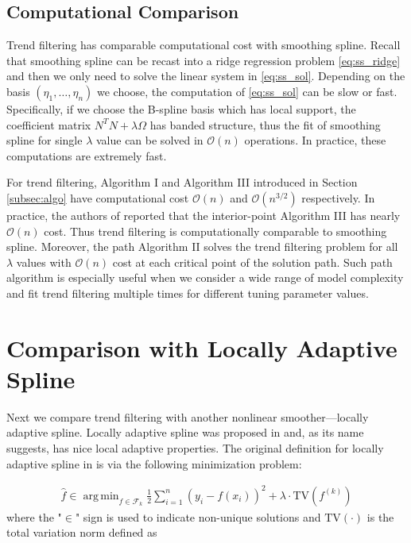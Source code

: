 \documentclass[a4paper]{article}
\DeclareMathOperator*{\argmin}{arg\,min}
\renewcommand{\cal}{\mathcal}
\begin{document}
\subsection{Computational Comparison}
\label{subsec:sscomp}
Trend filtering has comparable computational cost with smoothing spline. Recall that smoothing spline can be recast into a ridge regression problem \eqref{eq:ss_ridge} and then we only need to solve the linear system in \eqref{eq:ss_sol}. Depending on the basis $(\eta_1,\ldots, \eta_n)$ we choose, the computation of \eqref{eq:ss_sol} can be slow or fast. Specifically, if we choose the B-spline basis which has local support, the coefficient matrix $N^TN+\lambda\Omega$ has banded structure, thus the fit of smoothing spline for single $\lambda$ value can be solved in $\cal{O}(n)$ operations. In practice, these computations are extremely fast. 

For trend filtering, Algorithm I and Algorithm III introduced in Section \ref{subsec:algo} have computational cost $\cal{O}(n)$ and $\cal{O}(n^{3/2})$ respectively. In practice, the authors of \cite{kim2009ell_1} reported that the interior-point Algorithm III has nearly $\cal{O}(n)$ cost. Thus trend filtering is computationally comparable to smoothing spline. Moreover, the path Algorithm II solves the trend filtering problem for all $\lambda$ values with $\cal{O}(n)$ cost at each critical point of the solution path. Such path algorithm is especially useful when we consider a wide range of model complexity and fit trend filtering multiple times for different tuning parameter values.

\section{Comparison with Locally Adaptive Spline}
\label{sec:las_compare}

Next we compare trend filtering with another nonlinear smoother---locally adaptive spline. Locally adaptive spline was proposed in \cite{mammen1997locally} and, as its name suggests, has nice local adaptive properties. The original definition for locally adaptive spline in \cite{mammen1997locally} is via the following minimization problem:

\begin{align}
\hat{f} \in \argmin_{f\in\cal{F}_k} \frac{1}{2}\sum_{i=1}^n (y_i - f(x_i))^2 + \lambda\cdot\text{TV}(f^{(k)})
\label{eq:las_unconstrained}
\end{align}
where the "$\in$" sign is used to indicate non-unique solutions and $\text{TV}(\cdot)$ is the total variation norm defined as 
\end{document}
